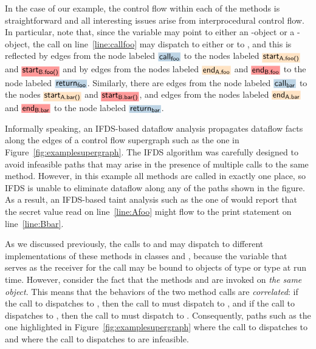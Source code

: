 In the case of our example, the control flow within each of the methods is straightforward and
all interesting issues arise from interprocedural control flow. In particular,
note that, since the variable  may point to either an -object or a -object, 
the call on line~\ref{line:callfoo} may dispatch to either  or to ,
and this is reflected by edges  
  from the node labeled $\highlight{\code{call}_\code{foo}}{greyblue}$ to the nodes labeled
  $\highlight{\code{start}_\code{A.foo()}}{bisque}$ and $\highlight{\code{start}_\code{B.foo()}}{lightsalmonpink}$
and by edges
  from the nodes labeled $\highlight{\code{end}_\code{A.foo}}{bisque}$ and $\highlight{\code{end}_\code{B.foo}}{lightsalmonpink}$ 
  to the node labeled  $\highlight{\code{return}_\code{foo}}{greyblue}$.  
Similarly, there are edges from the node labeled $\highlight{\code{call}_\code{bar}}{greyblue}$ to the nodes 
$\highlight{\code{start}_\code{A.bar()}}{bisque}$ and $\highlight{\code{start}_\code{B.bar()}}{lightsalmonpink}$, and 
edges
  from the nodes labeled $\highlight{\code{end}_\code{A.bar}}{bisque}$ and $\highlight{\code{end}_\code{B.bar}}{lightsalmonpink}$ 
  to the node labeled  $\highlight{\code{return}_\code{bar}}{greyblue}$. 
 
Informally speaking, an IFDS-based dataflow analysis propagates dataflow facts along the edges
of a control flow supergraph such as the one in Figure~\ref{fig:examplesupergraph}. The
IFDS algorithm was carefully designed to avoid infeasible paths that may arise in the
presence of multiple calls to the same method. However, in this example all methods are
called in exactly one place, so IFDS is unable to eliminate dataflow along any of the
paths shown in the figure. As a result, an IFDS-based taint analysis such as the
one of  would report that the secret value read on line~\ref{line:Afoo}
might flow to the print statement on line~\ref{line:Bbar}. 

As we discussed previously, the calls to  and  may dispatch
to different implementations of these methods in classes  and , 
because the variable  that serves as the receiver for the call may be bound to
 objects of type  or type  at run time. 
However, consider the fact that the methods  and  are invoked
on \textit{the same object}. This means that the behaviors of the two method calls
are \textit{correlated}: if the call to  dispatches to ,
then the call to  must dispatch to , and if the call
to  dispatches to , then the call to  must 
dispatch to .  Consequently, paths such as the one highlighted in
Figure~\ref{fig:examplesupergraph} where the call to  dispatches 
to  and where the call to  dispatches to 
are infeasible.  

